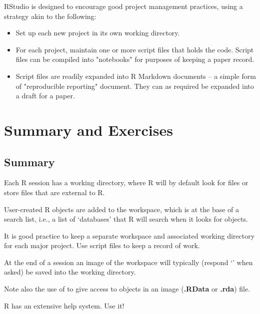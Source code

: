 RStudio is designed to encourage good project management practices,
using a strategy akin to the following:
\begin{itemize}
\item[] Set up each new project in its own working directory.
\item[] For each project, maintain one or more script files that
holds the code.  Script files can be compiled into "notebooks"
for purposes of keeping a paper record.
\item[] Script files are readily expanded into R Markdown documents
-- a simple form of "reproducible reporting" document.  They can
as required be expanded into a draft for a paper.
\end{itemize}


\section{Summary and Exercises}

\subsection{Summary}
\begin{itemizz}
\item[] Each R session has a working directory, where R will by
  default look for files or store files that are external to R.
\item[]
User-created R objects are added to the workspace, which is
at the base of a search list, i.e., a list of `databases' that R
will search when it looks for objects.
\item[] It is good practice to keep a separate workspace and
  associated working directory for each major project.  Use script
  files to keep a record of work.  
\item[] At the end of a session an image of the workspace will
  typically (respond `' when asked) be saved into the working
  directory.
\item[] Note also the use of  to give access to objects
  in an image (\textbf{.RData} or \textbf{.rda})
  file.
\item[] R has an extensive help system.  Use it!
\end{itemizz}

